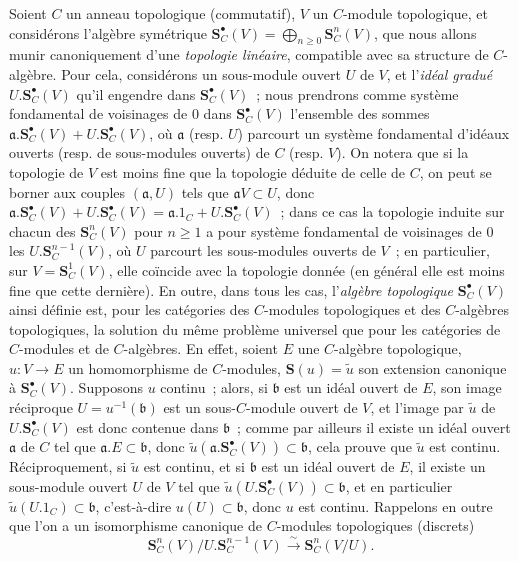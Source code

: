 \begin{env}[19.5.1]
\label{0.19.5.1-fr}
Soient $C$ un anneau topologique (commutatif), $V$ un $C$-module topologique,
et considérons l'algèbre symétrique
$\mathbf S_C^\bullet(V)=\bigoplus_{n\geq0}\mathbf S_C^n(V)$, que nous allons munir
canoniquement d'une \emph{topologie linéaire}, compatible avec sa structure de
$C$-algèbre. Pour cela, considérons un sous-module ouvert $U$ de $V$, et
l'\emph{idéal gradué} $U.\mathbf S_C^\bullet(V)$ qu'il engendre dans
$\mathbf S_C^\bullet(V)$~; nous prendrons comme système fondamental de voisinages de
$0$ dans $\mathbf S_C^\bullet(V)$ l'ensemble des sommes
$\mathfrak a.\mathbf S_C^\bullet(V)+U.\mathbf S_C^\bullet(V)$, où $\mathfrak a$ (resp.
$U$) parcourt un système fondamental d'idéaux ouverts (resp. de sous-modules
ouverts) de $C$ (resp. $V$). On notera que si la topologie de $V$ est moins
fine que la topologie déduite de celle de $C$, on peut se borner aux couples
$(\mathfrak a,U)$ tels que $\mathfrak aV\subset U$, donc
$\mathfrak a.\mathbf S_C^\bullet(V)+U.\mathbf S_C^\bullet(V)
=\mathfrak a.1_C+U.\mathbf S_C^\bullet(V)$~; dans ce cas la topologie induite sur
chacun des $\mathbf S_C^n(V)$ pour $n\geq1$ a pour système fondamental de
voisinages de $0$ les $U.\mathbf S_C^{n-1}(V)$, où $U$ parcourt les
sous-modules ouverts de $V$~; en particulier, sur $V=\mathbf S_C^1(V)$, elle
coïncide avec la topologie donnée (en général elle est moins fine que cette
dernière). En outre, dans tous les cas, l'\emph{algèbre topologique}
$\mathbf S_C^\bullet(V)$ ainsi définie est, pour les catégories des $C$-modules
topologiques et des $C$-algèbres topologiques, la solution du même problème
universel que pour les catégories de $C$-modules et de $C$-algèbres. En effet,
soient $E$ une $C$-algèbre topologique, $u:V\to E$ un homomorphisme de
$C$-modules, $\mathbf S(u)=\widetilde u$ son extension canonique à
$\mathbf S_C^\bullet(V)$. Supposons $u$ continu~; alors, si $\mathfrak b$ est un
idéal ouvert de $E$, son image réciproque $U=u^{-1}(\mathfrak b)$ est un
sous-$C$-module ouvert de $V$, et l'image par $\widetilde u$ de
$U.\mathbf S_C^\bullet(V)$ est donc contenue dans $\mathfrak b$~; comme par ailleurs
il existe un idéal ouvert $\mathfrak a$ de $C$ tel que
$\mathfrak a.E\subset\mathfrak b$, donc
$\widetilde u(\mathfrak a.\mathbf S_C^\bullet(V))\subset\mathfrak b$, cela prouve
que $\widetilde u$ est continu. Réciproquement, si $\widetilde u$ est continu,
et si $\mathfrak b$ est un idéal ouvert de $E$, il existe un sous-module ouvert
$U$ de $V$ tel que $\widetilde u(U.\mathbf S_C^\bullet(V))\subset\mathfrak b$, et en
particulier $\widetilde u(U.1_C)\subset\mathfrak b$, c'est-à-dire
$u(U)\subset\mathfrak b$, donc $u$ est continu. Rappelons en outre que l'on a
un isomorphisme canonique de $C$-modules topologiques (discrets)
\begin{equation}
\label{0.19.5.1.1-fr}
  \mathbf S_C^n(V)/U.\mathbf S_C^{n-1}(V)
  \xrightarrow{\sim}\mathbf S_C^n(V/U).
  \tag{19.5.1.1}
\end{equation}
\end{env}

